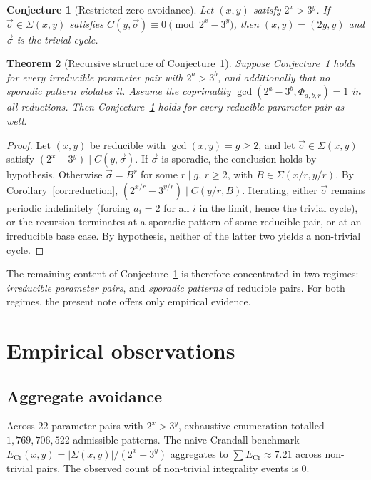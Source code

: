 \documentclass[11pt,a4paper]{article}
\theoremstyle{plain}
\newtheorem{theorem}{Theorem}
\newtheorem{conjecture}[theorem]{Conjecture}
\theoremstyle{definition}
\begin{document}
\begin{conjecture}[Restricted zero-avoidance]\label{conj:main}
Let $(x, y)$ satisfy $2^x > 3^y$. If $\vec\sigma \in \Sigma(x, y)$ satisfies
$C(y, \vec\sigma) \equiv 0 \pmod{2^x - 3^y}$, then $(x, y) = (2 y, y)$
and $\vec\sigma$ is the trivial cycle.
\end{conjecture}

\begin{theorem}[Recursive structure of Conjecture~\ref{conj:main}]\label{thm:reduction-structure}
Suppose Conjecture~\ref{conj:main} holds for every irreducible parameter pair
with $2^a > 3^b$, and additionally that no sporadic pattern violates it.
Assume the coprimality $\gcd(2^a - 3^b, \Phi_{a, b, r}) = 1$ in all reductions.
Then Conjecture~\ref{conj:main} holds for every reducible parameter pair as well.
\end{theorem}

\begin{proof}
Let $(x, y)$ be reducible with $\gcd(x, y) = g \ge 2$, and let
$\vec\sigma \in \Sigma(x, y)$ satisfy $(2^x - 3^y) \mid C(y, \vec\sigma)$.
If $\vec\sigma$ is sporadic, the conclusion holds by hypothesis. Otherwise
$\vec\sigma = B^r$ for some $r \mid g$, $r \ge 2$, with $B \in \Sigma(x/r, y/r)$.
By Corollary~\ref{cor:reduction}, $(2^{x/r} - 3^{y/r}) \mid C(y/r, B)$. Iterating,
either $\vec\sigma$ remains periodic indefinitely (forcing $a_i = 2$ for all $i$
in the limit, hence the trivial cycle), or the recursion terminates at a sporadic
pattern of some reducible pair, or at an irreducible base case. By hypothesis,
neither of the latter two yields a non-trivial cycle.
\end{proof}

The remaining content of Conjecture~\ref{conj:main} is therefore concentrated in
two regimes: \emph{irreducible parameter pairs}, and \emph{sporadic patterns} of
reducible pairs. For both regimes, the present note offers only empirical evidence.


\section{Empirical observations}

\subsection{Aggregate avoidance}\label{sec:aggregate}

Across 22 parameter pairs with $2^x > 3^y$, exhaustive enumeration totalled
$1{,}769{,}706{,}522$ admissible patterns. The naive Crandall benchmark
$E_{\mathrm{Cr}}(x, y) = |\Sigma(x, y)| / (2^x - 3^y)$ aggregates to
$\sum E_{\mathrm{Cr}} \approx 7.21$ across non-trivial pairs. The observed
count of non-trivial integrality events is $0$.
\end{document}
